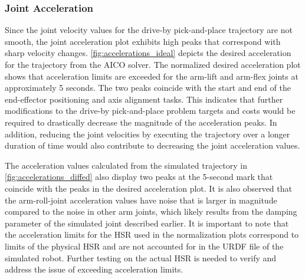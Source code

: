 \documentclass[11pt]{article}
\begin{document}
        \subsubsection{Joint Acceleration}
            Since the joint velocity values for the drive-by pick-and-place trajectory are not smooth, the joint acceleration plot exhibits high peaks that correspond with sharp velocity changes. \cref{fig:accelerations_ideal} depicts the desired acceleration for the trajectory from the AICO solver. The normalized desired acceleration plot shows that acceleration limits are exceeded for the arm-lift and arm-flex joints at approximately 5 seconds. The two peaks coincide with the start and end of the end-effector positioning and axis alignment tasks. This indicates that further modifications to the drive-by pick-and-place problem targets and costs would be required to drastically decrease the magnitude of the acceleration peaks. In addition, reducing the joint velocities by executing the trajectory over a longer duration of time would also contribute to decreasing the joint acceleration values.
            \par The acceleration values calculated from the simulated trajectory in \cref{fig:accelerations_diffed} also display two peaks at the 5-second mark that coincide with the peaks in the desired acceleration plot. It is also observed that the arm-roll-joint acceleration values have noise that is larger in magnitude compared to the noise in other arm joints, which likely results from the damping parameter of the simulated joint described earlier. It is important to note that the acceleration limits for the HSR used in the normalization plots correspond to limits of the physical HSR and are not accounted for in the URDF file of the simulated robot. Further testing on the actual HSR is needed to verify and address the issue of exceeding acceleration limits.
\end{document}
